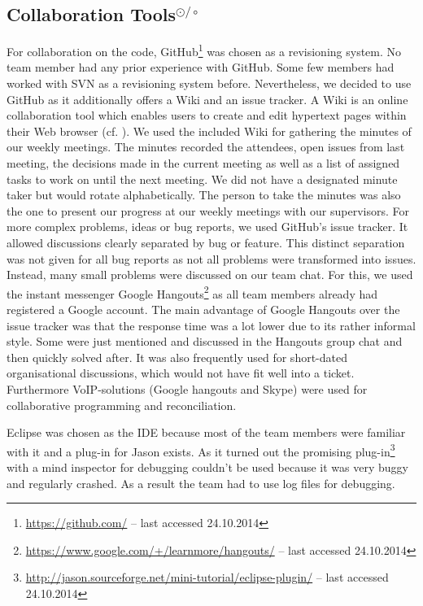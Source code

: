 \subsection[Collaboration Tools]{Collaboration Tools$^{\odot/\circ}$}
For collaboration on the code, GitHub\footnote{\url{https://github.com/} -- last accessed 24.10.2014} was chosen as a revisioning system. %
No team member had any prior experience with GitHub.
Some few members had worked with SVN as a revisioning system before.
Nevertheless, we decided to use GitHub as it additionally offers a Wiki and an issue tracker. %
A Wiki is an online collaboration tool which enables users to create and edit hypertext pages within their Web browser (cf. \cite{leuf_wiki_2001}).
We used the included Wiki for gathering the minutes of our weekly meetings.
The minutes recorded the attendees, open issues from last meeting, the decisions made in the current meeting as well as a list of assigned tasks to work on until the next meeting.
We did not have a designated minute taker but would rotate alphabetically.
The person to take the minutes was also the one to present our progress at our weekly meetings with our supervisors.
For more complex problems, ideas or bug reports, we used GitHub's issue tracker.
It allowed discussions clearly separated by bug or feature.
This distinct separation was not given for all bug reports as not all problems were transformed into issues.
Instead, many small problems were discussed on our team chat.
For this, we used the instant messenger Google Hangouts\footnote{\url{https://www.google.com/+/learnmore/hangouts/} -- last accessed 24.10.2014} as all team members already had registered a Google account.
The main advantage of Google Hangouts over the issue tracker was that the response time was a lot lower due to its rather informal style.
Some were just mentioned and discussed in the Hangouts group chat and then quickly solved after.
It was also frequently used for short-dated organisational discussions, which would not have fit well into a ticket.
Furthermore VoIP-solutions (Google hangouts and Skype) were used for collaborative programming and reconciliation.

Eclipse was chosen as the IDE because most of the team members were familiar with it and a plug-in for Jason exists.
As it turned out the promising plug-in\footnote{\url{http://jason.sourceforge.net/mini-tutorial/eclipse-plugin/} -- last accessed 24.10.2014} with a mind inspector for debugging couldn't be used because it was very buggy and regularly crashed.
As a result the team had to use log files for debugging.
